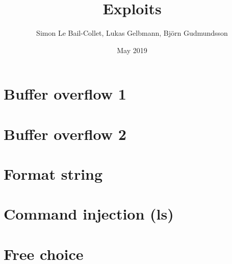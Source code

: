 \documentclass{article}
\title{Exploits}
\author{Simon Le Bail-Collet, Lukas Gelbmann, Björn Gudmundsson}
\date{May 2019}
\begin{document}
\maketitle

\section{Buffer overflow 1}

\section{Buffer overflow 2}

\section{Format string}

\section{Command injection (ls)}

\section{Free choice}
\end{document}
